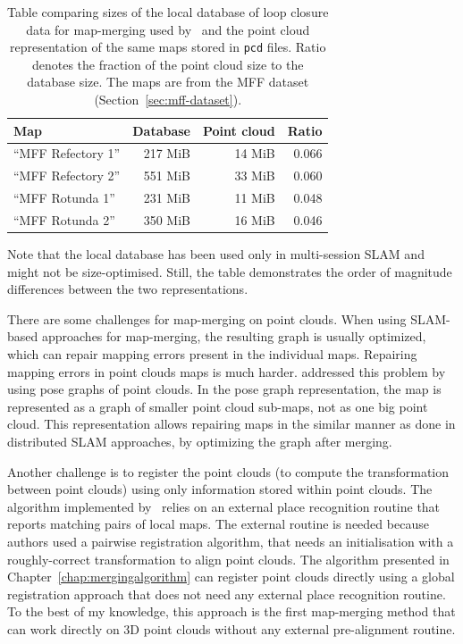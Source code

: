 \begin{table}[b!]

	\centering
	\begin{tabular}{lrr D{.}{.}{3}}
	\toprule
	\textbf{Map} & \textbf{Database} & \textbf{Point cloud} & \textbf{Ratio} \\
	\midrule
	``MFF Refectory 1'' & 217 MiB & 14 MiB & 0.066 \\
	``MFF Refectory 2'' & 551 MiB & 33 MiB & 0.060 \\
	``MFF Rotunda 1'' & 231 MiB & 11 MiB & 0.048 \\
	``MFF Rotunda 2'' & 350 MiB & 16 MiB & 0.046 \\
	\bottomrule
	\end{tabular}
	\caption{Table comparing sizes of the local database of loop closure data for map-merging used by~\citet{labbe2014online} and the point cloud representation of the same maps stored in \texttt{pcd} files. Ratio denotes the fraction of the point cloud size to the database size. The maps are from the MFF dataset (Section~\ref{sec:mff-dataset}).}
	\label{tabl:rtabmap-db-vs-point-clouds}
\end{table}

Note that the local database has been used only in multi-session \gls{SLAM} and might not be size-optimised. Still, the table demonstrates the order of magnitude differences between the two representations.

There are some challenges for map-merging on point clouds. When using \gls{SLAM}-based approaches for map-merging, the resulting graph is usually optimized, which can repair mapping errors present in the individual maps. Repairing mapping errors in point clouds maps is much harder. \citet{bonanni2017pose} addressed this problem by using pose graphs of point clouds. In the pose graph representation, the map is represented as a graph of smaller point cloud sub-maps, not as one big point cloud. This representation allows repairing maps in the similar manner as done in distributed \gls{SLAM} approaches, by optimizing the graph after merging.

Another challenge is to register the point clouds (to compute the transformation between point clouds) using only information stored within point clouds. The algorithm implemented by~\citet{bonanni2017pose} relies on an external place recognition routine that reports matching pairs of local maps. The external routine is needed because authors used a pairwise registration algorithm, that needs an initialisation with a roughly-correct transformation to align point clouds. The algorithm presented in Chapter~\ref{chap:mergingalgorithm} can register point clouds directly using a global registration approach that does not need any external place recognition routine. To the best of my knowledge, this approach is the first map-merging method that can work directly on \gls{3D} point clouds without any external pre-alignment routine.

